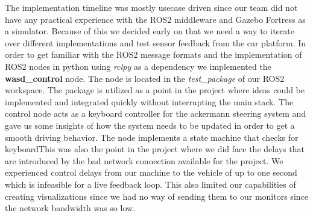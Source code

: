 The implementation timeline was mostly usecase driven since our team did not have any practical experience with the ROS2 middleware and Gazebo Fortress as a simulator. Because of this we decided early on that we need a way to iterate over different implementations and test sensor feedback from the car platform. In order to get familiar with the ROS2 message formats and the implementation of ROS2 nodes in python using \textit{rclpy} as a dependency we implemented the \textbf{wasd\_control} node. The node is located in the \textit{test\_package} of our ROS2 workspace. The package is utilized as a point in the project where ideas could be implemented and integrated quickly without interrupting the main stack. The control node acts as a keyboard controller for the ackermann steering system and gave us some insights of how the system needs to be updated in order to get a smooth driving behavior. The node implements a state machine that checks for keyboardThis was also the point in the project where we did face the delays that are introduced by the bad network connection available for the project. We experienced control delays from our machine to the vehicle of up to one second which is infeasible for a live feedback loop. This also limited our capabilities of creating visualizations since we had no way of sending them to our monitors since the network bandwidth was so low.



